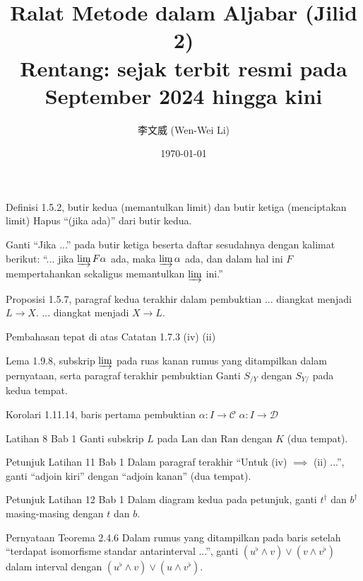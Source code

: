 \documentclass{AJerrata}
\title{\bfseries Ralat Metode dalam Aljabar (Jilid 2) \\ Rentang: sejak terbit resmi pada September 2024 hingga kini }
\author{李文威 (Wen-Wei Li)}
\date{\today}
\begin{document}
	\maketitle

	\begin{Errata}
		\item[Definisi 1.5.2, butir kedua (memantulkan limit) dan butir ketiga (menciptakan limit)]
		Hapus ``(jika ada)'' dari butir kedua.
		
		Ganti ``Jika ...'' pada butir ketiga beserta daftar sesudahnya dengan kalimat berikut: ``... jika $\varinjlim F\alpha$ ada, maka $\varinjlim \alpha$ ada, dan dalam hal ini $F$ mempertahankan sekaligus memantulkan $\varinjlim$ ini.''
		
		\item[Proposisi 1.5.7, paragraf kedua terakhir dalam pembuktian]
		\Orig ... diangkat menjadi $L \to X$.
		\Corr ... diangkat menjadi $X \to L$.
		
		\item[Pembahasan tepat di atas Catatan 1.7.3]
		\Orig (iv)
		\Corr (ii)
		
		\item[Lema 1.9.8, subskrip $\varinjlim$ pada ruas kanan rumus yang ditampilkan dalam pernyataan, serta paragraf terakhir pembuktian]
		Ganti $S_{/Y}$ dengan $S_{Y/}$ pada kedua tempat.
		
		\item[Korolari 1.11.14, baris pertama pembuktian]
		\Orig $\alpha: I \to \mathcal{C}$
		\Corr $\alpha: I \to \mathcal{D}$
		
		\item[Latihan 8 Bab 1]
		Ganti subskrip $L$ pada $\mathrm{Lan}$ dan $\mathrm{Ran}$ dengan $K$ (dua tempat).
		
		\item[Petunjuk Latihan 11 Bab 1] Dalam paragraf terakhir ``Untuk (iv) $\implies$ (ii) ...'', ganti ``adjoin kiri'' dengan ``adjoin kanan'' (dua tempat).
		
		\item[Petunjuk Latihan 12 Bab 1] Dalam diagram kedua pada petunjuk, ganti $t^\dagger$ dan $b^\dagger$ masing-masing dengan $t$ dan $b$.
		
		\item[Pernyataan Teorema 2.4.6]
		Dalam rumus yang ditampilkan pada baris setelah ``terdapat isomorfisme standar antarinterval ...'', ganti $(u^{\flat} \wedge v) \vee (v \wedge v^{\flat})$ dalam interval dengan $(u^{\flat} \wedge v) \vee (u \wedge v^{\flat})$.
		

\end{Errata}
\end{document}
